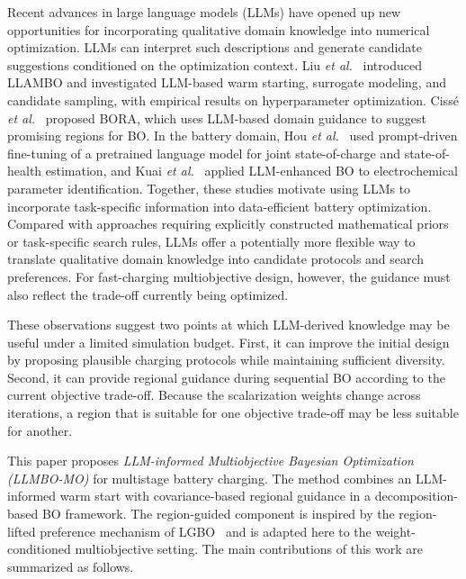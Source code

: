 \documentclass[journal,10pt]{IEEEtran}
\begin{document}
Recent advances in large language models (LLMs) have opened up new
opportunities for incorporating qualitative domain knowledge into numerical
optimization. LLMs can interpret such descriptions and generate candidate
suggestions conditioned on the optimization context. Liu \emph{et al.}~\cite{nref12}
introduced LLAMBO and investigated LLM-based warm starting, surrogate modeling,
and candidate sampling, with empirical results on hyperparameter optimization.
Ciss\'e \emph{et al.}~\cite{refBORA} proposed BORA, which uses LLM-based domain
guidance to suggest promising regions for BO. In the battery domain,
Hou \emph{et al.}~\cite{refBianLLM} used prompt-driven fine-tuning of a
pretrained language model for joint state-of-charge and state-of-health estimation,
and Kuai \emph{et al.}~\cite{refKuaiLLMBO} applied LLM-enhanced BO to
electrochemical parameter identification. Together, these studies motivate
using LLMs to incorporate task-specific information into data-efficient battery
optimization. Compared with approaches requiring explicitly constructed
mathematical priors or task-specific search rules, LLMs offer a potentially
more flexible way to translate qualitative domain knowledge into candidate
protocols and search preferences. For fast-charging multiobjective design,
however, the guidance must also reflect the trade-off currently being
optimized.

These observations suggest two points at which LLM-derived knowledge may be
useful under a limited simulation budget. First, it can improve the initial
design by proposing plausible charging protocols while maintaining sufficient
diversity. Second, it can provide regional guidance during sequential BO
according to the current objective trade-off. Because the scalarization weights
change across iterations, a region that is suitable for one objective trade-off
may be less suitable for another.

This paper proposes \emph{LLM-informed Multiobjective Bayesian Optimization
(LLMBO-MO)} for multistage battery charging. The method combines an
LLM-informed warm start with covariance-based regional guidance in a
decomposition-based BO framework. The region-guided component is inspired by
the region-lifted preference mechanism of LGBO~\cite{ref5} and is adapted
here to the weight-conditioned multiobjective setting. The main contributions
of this work are summarized as follows.
\end{document}
